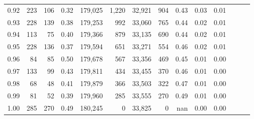 \begin{tabular}{rrrrrrrrrrrrrr}
0.92 &    223 &  106 &  0.32 &  179,025 &    1,220 &  32,921 &     904 &  0.43 &  0.03 &      0.01 \\
0.93 &    228 &  139 &  0.38 &  179,253 &      992 &  33,060 &     765 &  0.44 &  0.02 &      0.01 \\
0.94 &    113 &   75 &  0.40 &  179,366 &      879 &  33,135 &     690 &  0.44 &  0.02 &      0.01 \\
0.95 &    228 &  136 &  0.37 &  179,594 &      651 &  33,271 &     554 &  0.46 &  0.02 &      0.01 \\
0.96 &     84 &   85 &  0.50 &  179,678 &      567 &  33,356 &     469 &  0.45 &  0.01 &      0.00 \\
0.97 &    133 &   99 &  0.43 &  179,811 &      434 &  33,455 &     370 &  0.46 &  0.01 &      0.00 \\
0.98 &     68 &   48 &  0.41 &  179,879 &      366 &  33,503 &     322 &  0.47 &  0.01 &      0.00 \\
0.99 &     81 &   52 &  0.39 &  179,960 &      285 &  33,555 &     270 &  0.49 &  0.01 &      0.00 \\
1.00 &    285 &  270 &  0.49 &  180,245 &        0 &  33,825 &       0 &   nan &  0.00 &      0.00 \\
\bottomrule
\end{tabular}

